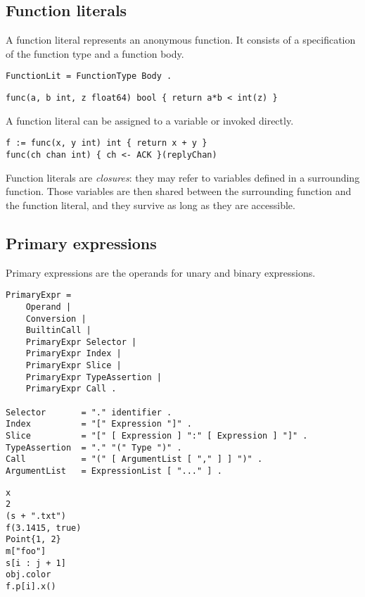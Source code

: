 \subsection*{Function literals}

A function literal represents an anonymous function. It consists of a
specification of the function type and a function body.

\begin{Verbatim}[frame=single]
FunctionLit = FunctionType Body .
\end{Verbatim}

\begin{Verbatim}[frame=single]
func(a, b int, z float64) bool { return a*b < int(z) }
\end{Verbatim}

A function literal can be assigned to a variable or invoked directly.

\begin{Verbatim}[frame=single]
f := func(x, y int) int { return x + y }
func(ch chan int) { ch <- ACK }(replyChan)
\end{Verbatim}

Function literals are \emph{closures}: they may refer to variables
defined in a surrounding function. Those variables are then shared
between the surrounding function and the function literal, and they
survive as long as they are accessible.

\subsection*{Primary expressions}

Primary expressions are the operands for unary and binary expressions.

\begin{Verbatim}[frame=single]
PrimaryExpr =
    Operand |
    Conversion |
    BuiltinCall |
    PrimaryExpr Selector |
    PrimaryExpr Index |
    PrimaryExpr Slice |
    PrimaryExpr TypeAssertion |
    PrimaryExpr Call .

Selector       = "." identifier .
Index          = "[" Expression "]" .
Slice          = "[" [ Expression ] ":" [ Expression ] "]" .
TypeAssertion  = "." "(" Type ")" .
Call           = "(" [ ArgumentList [ "," ] ] ")" .
ArgumentList   = ExpressionList [ "..." ] .
\end{Verbatim}

\begin{Verbatim}[frame=single]
x
2
(s + ".txt")
f(3.1415, true)
Point{1, 2}
m["foo"]
s[i : j + 1]
obj.color
f.p[i].x()
\end{Verbatim}


